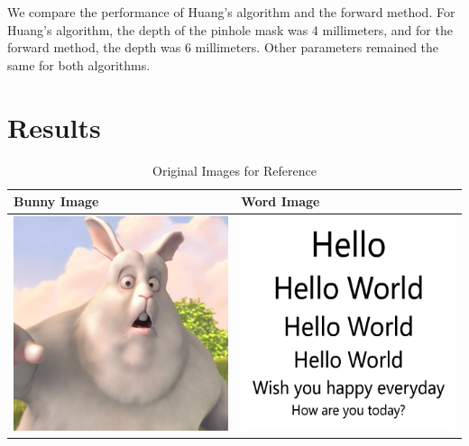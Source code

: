 
We compare the performance of Huang's algorithm and the forward method. For Huang’s algorithm, the depth of the pinhole mask was 4 millimeters, and for the forward method, the depth was 6 millimeters. Other parameters remained the same for both algorithms. 

\section{Results} 

\begin{table}[!h]
    \caption{Original Images for Reference}
    \begin{tabular}{| l | l }
    \hline Bunny Image & Word Image \\ \hline
      \includegraphics[width=3in]{chapters/chapter5/images/Clean_Images/0084_820.png} &
      \includegraphics[width=3in]{chapters/chapter5/images/Clean_Images/Hello.png} \\ \hline
    \end{tabular}
\end{table}


